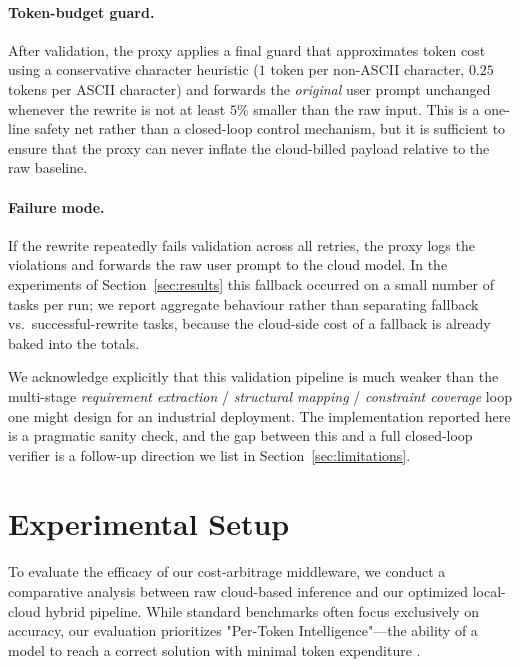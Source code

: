 \documentclass[11pt,a4paper,twocolumn]{article}
\begin{document}
\paragraph{Token-budget guard.} After validation, the proxy applies a final guard that approximates token cost using a conservative character heuristic ($1$ token per non-ASCII character, $0.25$ tokens per ASCII character) and forwards the \emph{original} user prompt unchanged whenever the rewrite is not at least $5\%$ smaller than the raw input. This is a one-line safety net rather than a closed-loop control mechanism, but it is sufficient to ensure that the proxy can never inflate the cloud-billed payload relative to the raw baseline.

\paragraph{Failure mode.} If the rewrite repeatedly fails validation across all retries, the proxy logs the violations and forwards the raw user prompt to the cloud model. In the experiments of Section~\ref{sec:results} this fallback occurred on a small number of tasks per run; we report aggregate behaviour rather than separating fallback vs.\ successful-rewrite tasks, because the cloud-side cost of a fallback is already baked into the totals.

We acknowledge explicitly that this validation pipeline is much weaker than the multi-stage \emph{requirement extraction} / \emph{structural mapping} / \emph{constraint coverage} loop one might design for an industrial deployment. The implementation reported here is a pragmatic sanity check, and the gap between this and a full closed-loop verifier is a follow-up direction we list in Section~\ref{sec:limitations}.


\section{Experimental Setup}
\label{sec:setup}
To evaluate the efficacy of our cost-arbitrage middleware, we conduct a comparative analysis between raw cloud-based inference and our optimized local-cloud hybrid pipeline. While standard benchmarks often focus exclusively on accuracy, our evaluation prioritizes "Per-Token Intelligence"---the ability of a model to reach a correct solution with minimal token expenditure \cite{du2026ockbench}.
\end{document}
